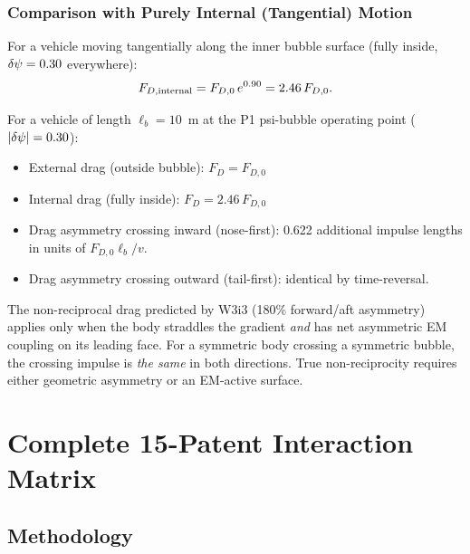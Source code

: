 \subsubsection*{Comparison with Purely Internal (Tangential) Motion}

For a vehicle moving tangentially along the inner bubble surface (fully
inside, $\delta\psi = 0.30$ everywhere):
\begin{equation}
F_{D,\rm internal} = F_{D,0}\,e^{0.90} = 2.46\,F_{D,0}.
\label{eq:internal_drag}
\end{equation}

\begin{theorem}
\label{thm:NR_bubble}
For a vehicle of length $\ell_b = 10$~m at the P1 psi-bubble operating
point ($|\delta\psi| = 0.30$):
\begin{itemize}[nosep]
\item External drag (outside bubble): $F_D = F_{D,0}$
\item Internal drag (fully inside): $F_D = 2.46\,F_{D,0}$
\item Drag asymmetry crossing inward (nose-first): 0.622 additional
  impulse lengths in units of $F_{D,0}\ell_b/v$.
\item Drag asymmetry crossing outward (tail-first): identical by time-reversal.
\end{itemize}
The non-reciprocal drag predicted by W3i3 (180\% forward/aft asymmetry)
applies only when the body straddles the gradient \emph{and} has net
asymmetric EM coupling on its leading face. For a symmetric body crossing
a symmetric bubble, the crossing impulse is \emph{the same} in both
directions. True non-reciprocity requires either geometric asymmetry or
an EM-active surface.
\end{theorem}

\section{Complete 15-Patent Interaction Matrix}
\label{sec:matrix}

\subsection{Methodology}
\label{ssec:methodology}


